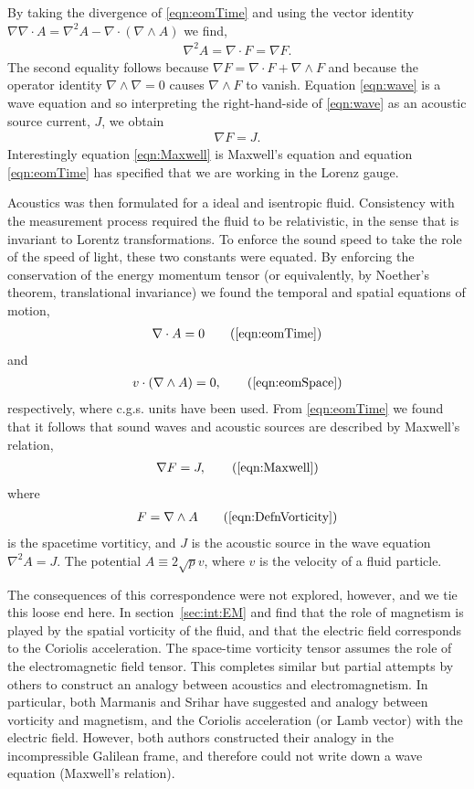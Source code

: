 \documentclass[10pt, fleqn,final,showtrims,oldfontcommands]{article} %
\newcommand{\eqa}[1]{\begin{align}#1\end{align}}
\newcommand{\eqal}[2]{\begin{align}#1\label{eqn:#2}\end{align}}
\newcommand{\secref}[1]{section~\ref{sec:#1}}
\newcommand{\eqnref}[1]{\ref{eqn:#1}}
\newcommand{\lr}[1]{\left( #1 \right)}
\newcommand{\del}{\nabla}
\begin{document}
By taking the divergence of \eqnref{eomTime} and using the vector identity
$\del \del \cdot A = \del^2 A - \del\cdot\lr{ \del \wedge A} $
 we find,
\eqal{
  \del^2 A = \del \cdot F = \del F.
}{wave}
The second equality follows because $\del F = \del \cdot F + \del \wedge F$ 
and because the  operator identity $\del\wedge \del = 0$ causes $\del \wedge F$ to vanish.
Equation \eqnref{wave} is a wave equation and so interpreting the right-hand-side of \eqnref{wave} as an acoustic source current, $J$, we obtain
\eqal{
  \del  F = J.
}{Maxwell}
Interestingly equation \eqnref{Maxwell} is Maxwell's equation and equation \eqnref{eomTime} has specified that we are working in the Lorenz gauge.


Acoustics was then formulated for  a ideal and isentropic fluid.
Consistency with the measurement process required the fluid to be relativistic, 
in the sense that is invariant to Lorentz transformations.
To enforce the sound speed to take the role of the speed of light, 
these two constants were equated.
By enforcing the conservation of the energy momentum tensor
(or equivalently, by Noether's theorem, translational invariance)
we found the temporal and spatial equations of motion,
\eqa{
  \del \cdot A  =0 \tag{\ref{eqn:eomTime}}
}
and
\begin{align}
v \cdot \lr{\del \wedge A} = 0, \tag{\ref{eqn:eomSpace}}
\end{align}
respectively,
where c.g.s. units have been  used.
%
%
From \eqnref{eomTime} we found that it follows that sound waves and acoustic sources are described by Maxwell's relation,
\eqa{
\del F = J, \tag{\ref{eqn:Maxwell}}
}
where 
\eqa{
  F = \del \wedge A\tag{\ref{eqn:DefnVorticity}}
} is the spacetime vortiticy,
and $J$ is the acoustic source in the wave equation $\del^2 A = J$.
The potential $A \equiv 2\sqrt p v$, where $v$ is the velocity of a fluid particle.

The consequences of this correspondence were not explored, however,
and we tie this loose end here.
In \secref{int:EM} and find that 
the role of magnetism is played by the spatial vorticity of the fluid,
and that the electric field corresponds to the Coriolis acceleration.
The space-time vorticity tensor assumes the role of the electromagnetic field tensor.
This completes similar but partial  attempts by others to construct an analogy between acoustics and electromagnetism.
In particular, both Marmanis\cite{Marmanis2000} and Srihar\cite{Sridhar1998}
have suggested and analogy between vorticity and magnetism, 
and the Coriolis acceleration (or Lamb vector) with the electric field.
However, both authors constructed their analogy in the incompressible Galilean frame, 
and therefore could not write down a wave equation (Maxwell's relation).
\end{document}
